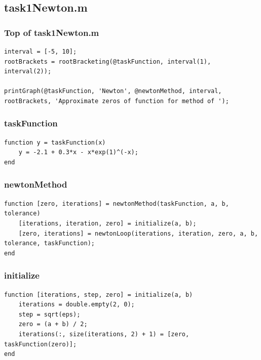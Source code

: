 \subsection{task1Newton.m}

\subsubsection{Top of task1Newton.m}
\begin{simplechar}
\begin{lstlisting}
interval = [-5, 10];
rootBrackets = rootBracketing(@taskFunction, interval(1), interval(2));

printGraph(@taskFunction, 'Newton', @newtonMethod, interval, rootBrackets, 'Approximate zeros of function for method of ');
\end{lstlisting}
\end{simplechar}

\subsubsection{taskFunction}
\begin{simplechar}
\begin{lstlisting}
function y = taskFunction(x)
    y = -2.1 + 0.3*x - x*exp(1)^(-x);
end
\end{lstlisting}
\end{simplechar}

\subsubsection{newtonMethod}
\begin{simplechar}
\begin{lstlisting}
function [zero, iterations] = newtonMethod(taskFunction, a, b, tolerance)
    [iterations, iteration, zero] = initialize(a, b);
    [zero, iterations] = newtonLoop(iterations, iteration, zero, a, b, tolerance, taskFunction);
end
\end{lstlisting}
\end{simplechar}

\subsubsection{initialize}
\begin{simplechar}
\begin{lstlisting}
function [iterations, step, zero] = initialize(a, b)
    iterations = double.empty(2, 0);
    step = sqrt(eps);
    zero = (a + b) / 2;
    iterations(:, size(iterations, 2) + 1) = [zero, taskFunction(zero)];
end
\end{lstlisting}
\end{simplechar}

